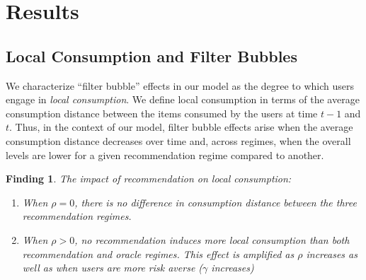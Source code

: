 \documentclass[format=acmsmall, review=false]{acmart}
\newtheorem{finding}{Finding}
\begin{document}
\section{Results}
\subsection{Local Consumption and Filter Bubbles}
We characterize ``filter bubble'' effects in our model as the degree to which users engage in \textit{local consumption}. We define local consumption in terms of the average consumption distance between the items consumed by the users at time $t-1$ and $t$. Thus, in the context of our model, filter bubble effects arise when the average consumption distance decreases over time and, across regimes, when the overall levels are lower for a given recommendation regime compared to another.


\begin{finding}\label{finding_local_consumption}
The impact of recommendation on local consumption:
\begin{enumerate}
\item When $\rho = 0$, there is no difference in consumption distance between the three recommendation regimes.
\item When $\rho > 0$, no recommendation induces more local consumption than both recommendation and oracle regimes. This effect is amplified as $\rho$ increases as well as when users are more risk averse ($\gamma$ increases)
\end{enumerate}
\end{finding}
\end{document}
